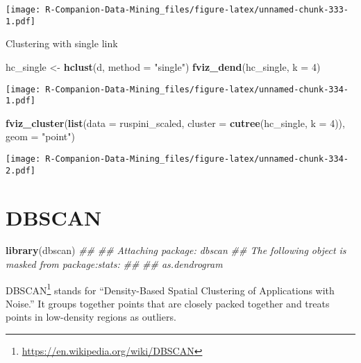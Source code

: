 \documentclass[
  notitlepage]{book}
\newenvironment{Shaded}{\begin{snugshade}}{\end{snugshade}}
\newcommand{\CommentTok}[1]{\textcolor[rgb]{0.56,0.35,0.01}{\textit{#1}}}
\newcommand{\DataTypeTok}[1]{\textcolor[rgb]{0.13,0.29,0.53}{#1}}
\newcommand{\DecValTok}[1]{\textcolor[rgb]{0.00,0.00,0.81}{#1}}
\newcommand{\KeywordTok}[1]{\textcolor[rgb]{0.13,0.29,0.53}{\textbf{#1}}}
\newcommand{\NormalTok}[1]{#1}
\newcommand{\StringTok}[1]{\textcolor[rgb]{0.31,0.60,0.02}{#1}}
\DeclareRobustCommand{\href}[2]{#2\footnote{\url{#1}}}
\begin{document}
\texttt{[image: R-Companion-Data-Mining\_files/figure-latex/unnamed-chunk-333-1.pdf]}

Clustering with single link

\begin{Shaded}
\begin{Highlighting}[]
\NormalTok{hc\_single \textless{}{-}}\StringTok{ }\KeywordTok{hclust}\NormalTok{(d, }\DataTypeTok{method =} \StringTok{"single"}\NormalTok{)}
\KeywordTok{fviz\_dend}\NormalTok{(hc\_single, }\DataTypeTok{k =} \DecValTok{4}\NormalTok{)}
\end{Highlighting}
\end{Shaded}

\texttt{[image: R-Companion-Data-Mining\_files/figure-latex/unnamed-chunk-334-1.pdf]}

\begin{Shaded}
\begin{Highlighting}[]
\KeywordTok{fviz\_cluster}\NormalTok{(}\KeywordTok{list}\NormalTok{(}\DataTypeTok{data =}\NormalTok{ ruspini\_scaled, }
                  \DataTypeTok{cluster =} \KeywordTok{cutree}\NormalTok{(hc\_single, }\DataTypeTok{k =} \DecValTok{4}\NormalTok{)), }
             \DataTypeTok{geom =} \StringTok{"point"}\NormalTok{)}
\end{Highlighting}
\end{Shaded}

\texttt{[image: R-Companion-Data-Mining\_files/figure-latex/unnamed-chunk-334-2.pdf]}

\hypertarget{dbscan}{%
\section{DBSCAN}\label{dbscan}}

\begin{Shaded}
\begin{Highlighting}[]
\KeywordTok{library}\NormalTok{(dbscan)}
\CommentTok{\#\# }
\CommentTok{\#\# Attaching package: \textquotesingle{}dbscan\textquotesingle{}}
\CommentTok{\#\# The following object is masked from \textquotesingle{}package:stats\textquotesingle{}:}
\CommentTok{\#\# }
\CommentTok{\#\#     as.dendrogram}
\end{Highlighting}
\end{Shaded}

\href{https://en.wikipedia.org/wiki/DBSCAN}{DBSCAN} stands for ``Density-Based
Spatial Clustering of Applications with Noise.'' It groups together
points that are closely packed together and treats points in low-density
regions as outliers.
\end{document}
